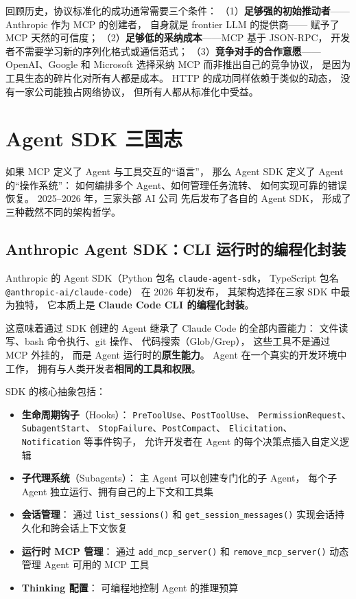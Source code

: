 \begin{whybox}
回顾历史，协议标准化的成功通常需要三个条件：
（1）\textbf{足够强的初始推动者}——Anthropic 作为 MCP 的创建者，
自身就是 frontier LLM 的提供商——
赋予了 MCP 天然的可信度；
（2）\textbf{足够低的采纳成本}——MCP 基于 JSON-RPC，
开发者不需要学习新的序列化格式或通信范式；
（3）\textbf{竞争对手的合作意愿}——
OpenAI、Google 和 Microsoft 选择采纳 MCP
而非推出自己的竞争协议，
是因为工具生态的碎片化对所有人都是成本。
HTTP 的成功同样依赖于类似的动态，
没有一家公司能独占网络协议，
但所有人都从标准化中受益。
\end{whybox}


\section{Agent SDK 三国志}
\label{sec:agent-sdk-wars}

如果 MCP 定义了 Agent 与工具交互的“语言”，
那么 Agent SDK 定义了 Agent 的“操作系统”：
如何编排多个 Agent、如何管理任务流转、
如何实现可靠的错误恢复。
2025--2026 年，三家头部 AI 公司
先后发布了各自的 Agent SDK，
形成了三种截然不同的架构哲学。

\subsection{Anthropic Agent SDK：CLI 运行时的编程化封装}

Anthropic 的 Agent SDK（Python 包名 \texttt{claude-agent-sdk}，
TypeScript 包名 \texttt{@anthropic-ai/claude-code}）
在 2026 年初发布，
其架构选择在三家 SDK 中最为独特，
它本质上是 \textbf{Claude Code CLI 的编程化封装}。

这意味着通过 SDK 创建的 Agent
继承了 Claude Code 的全部内置能力：
文件读写、bash 命令执行、git 操作、
代码搜索（Glob/Grep），
这些工具不是通过 MCP 外挂的，
而是 Agent 运行时的\textbf{原生能力}。
Agent 在一个真实的开发环境中工作，
拥有与人类开发者\textbf{相同的工具和权限}。

SDK 的核心抽象包括：
\begin{itemize}[noitemsep]
  \item \textbf{生命周期钩子}（Hooks）：
        \texttt{PreToolUse}、\texttt{PostToolUse}、
        \texttt{PermissionRequest}、\texttt{SubagentStart}、
        \texttt{StopFailure}、\texttt{PostCompact}、
        \texttt{Elicitation}、\texttt{Notification} 等事件钩子，
        允许开发者在 Agent 的每个决策点插入自定义逻辑
  \item \textbf{子代理系统}（Subagents）：
        主 Agent 可以创建专门化的子 Agent，
        每个子 Agent 独立运行、拥有自己的上下文和工具集
  \item \textbf{会话管理}：
        通过 \texttt{list\_sessions()} 和
        \texttt{get\_session\_messages()}
        实现会话持久化和跨会话上下文恢复
  \item \textbf{运行时 MCP 管理}：
        通过 \texttt{add\_mcp\_server()} 和
        \texttt{remove\_mcp\_server()}
        动态管理 Agent 可用的 MCP 工具
  \item \textbf{Thinking 配置}：
        可编程地控制 Agent 的推理预算
\end{itemize}

